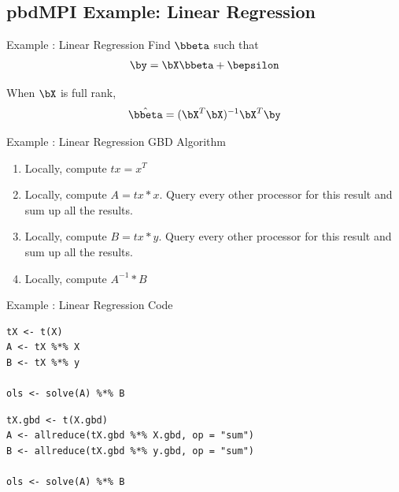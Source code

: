 \subsection{pbdMPI Example: Linear Regression}

\begin{frame}
  \begin{block}{Example \countex :  Linear Regression}\pause
      Find $\bbeta$ such that
      \begin{align*}
      \by = \bX\bbeta + \bepsilon
      \end{align*}

      When $\bX$ is full rank,
      \begin{align*}
      \hat{\bbeta} = (\bX^T\bX)^{-1}\bX^T\by \label{math:ols}
      \end{align*}
  \end{block}
\end{frame}


\begin{frame}
  \begin{block}{Example \showex :  Linear Regression GBD Algorithm}\pause
    \begin{enumerate}
     \item Locally, compute $tx = x^T$
     \item Locally, compute $A = tx * x$. Query every other processor for this result and sum up all the results.
     \item Locally, compute $B = tx * y$.  Query every other processor for this result and sum up all the results.
     \item Locally, compute $A^{-1} * B$
    \end{enumerate}
  \end{block}
\end{frame}


\begin{frame}
  \begin{exampleblock}{Example \showex :  Linear Regression Code}\pause
\begin{lstlisting}[title=Serial Code]
tX <- t(X)
A <- tX %*% X
B <- tX %*% y

ols <- solve(A) %*% B
\end{lstlisting}
  
\begin{lstlisting}[title=Parallel Code]
tX.gbd <- t(X.gbd)
A <- allreduce(tX.gbd %*% X.gbd, op = "sum")
B <- allreduce(tX.gbd %*% y.gbd, op = "sum")

ols <- solve(A) %*% B
\end{lstlisting}
  \end{exampleblock}
\end{frame}